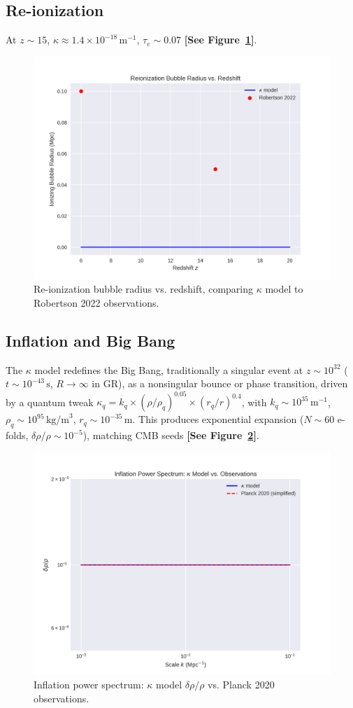 \documentclass[a4paper,12pt]{article}
\begin{document}
\subsection{Re-ionization}
At $z \sim 15$, $\kappa \approx 1.4 \times 10^{-18} \, \text{m}^{-1}$, $\tau_e \sim 0.07$ \citep{Robertson2022} \textbf{[See Figure~\ref{fig:9}]}.

\begin{figure}[H]
    \centering
    \includegraphics[width=0.8\linewidth]{figure9.png}
    \caption{Re-ionization bubble radius vs. redshift, comparing $\kappa$ model to Robertson 2022 observations.}
    \label{fig:9}
\end{figure}

\subsection{Inflation and Big Bang}
The $\kappa$ model redefines the Big Bang, traditionally a singular event at $z \sim 10^{32}$ ($t \sim 10^{-43} \, \text{s}$, $R \to \infty$ in GR), as a nonsingular bounce or phase transition, driven by a quantum tweak $\kappa_q = k_q \times (\rho/\rho_q)^{0.05} \times (r_q/r)^{0.4}$, with $k_q \sim 10^{35} \, \text{m}^{-1}$, $\rho_q \sim 10^{95} \, \text{kg/m}^3$, $r_q \sim 10^{-35} \, \text{m}$. This produces exponential expansion ($N \sim 60$ e-folds, $\delta\rho/\rho \sim 10^{-5}$), matching CMB seeds \citep{Planck2020} \textbf{[See Figure~\ref{fig:10}]}.

\begin{figure}[H]
    \centering
    \includegraphics[width=0.8\linewidth]{figure10.png}
    \caption{Inflation power spectrum: $\kappa$ model $\delta\rho/\rho$ vs. Planck 2020 observations.}
    \label{fig:10}
\end{figure}
\end{document}
